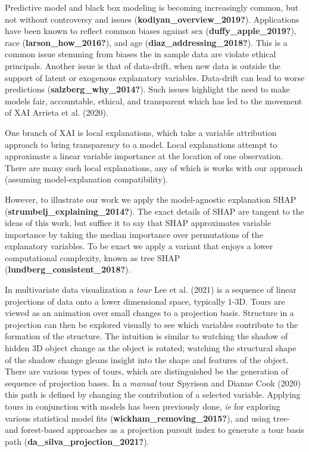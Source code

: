 \documentclass[
]{article}
\begin{document}
Predictive model and black box modeling is becoming increasingly common, but not without controversy and issues (\textbf{kodiyan\_overview\_2019?}). Applications have been known to reflect common biases against sex (\textbf{duffy\_apple\_2019?}), race (\textbf{larson\_how\_2016?}), and age (\textbf{diaz\_addressing\_2018?}). This is a common issue stemming from biases the in sample data are violate ethical principals. Another issue is that of data-drift, when new data is outside the support of latent or exogenous explanatory variables. Data-drift can lead to worse predictions (\textbf{salzberg\_why\_2014?}). Such issues highlight the need to make models fair, accountable, ethical, and transparent which has led to the movement of XAI Arrieta et al. (2020).

One branch of XAI is local explanations, which take a variable attribution approach to bring transparency to a model. Local explanations attempt to approximate a linear variable importance at the location of one observation. There are many such local explanations, any of which is works with our approach (assuming model-explanation compatibility).

However, to illustrate our work we apply the model-agnostic explanation SHAP (\textbf{strumbelj\_explaining\_2014?}). The exact details of SHAP are tangent to the ideas of this work, but suffice it to say that SHAP approximates variable importance by taking the median importance over permutations of the explanatory variables. To be exact we apply a variant that enjoys a lower computational complexity, known as tree SHAP (\textbf{lundberg\_consistent\_2018?}).

In multivariate data visualization a \emph{tour} Lee et al. (2021) is a sequence of linear projections of data onto a lower dimensional space, typically 1-3D. Tours are viewed as an animation over small changes to a projection basis. Structure in a projection can then be explored visually to see which variables contribute to the formation of the structure. The intuition is similar to watching the shadow of hidden 3D object change as the object is rotated; watching the structural shape of the shadow change gleans insight into the shape and features of the object. There are various types of tours, which are distinguished be the generation of sequence of projection bases. In a \emph{manual} tour Spyrison and Dianne Cook (2020) this path is defined by changing the contribution of a selected variable. Applying tours in conjunction with models has been previously done, \emph{ie} for exploring various statistical model fits (\textbf{wickham\_removing\_2015?}), and using tree- and forest-based approaches as a projection pursuit index to generate a tour basis path (\textbf{da\_silva\_projection\_2021?}).
\end{document}
